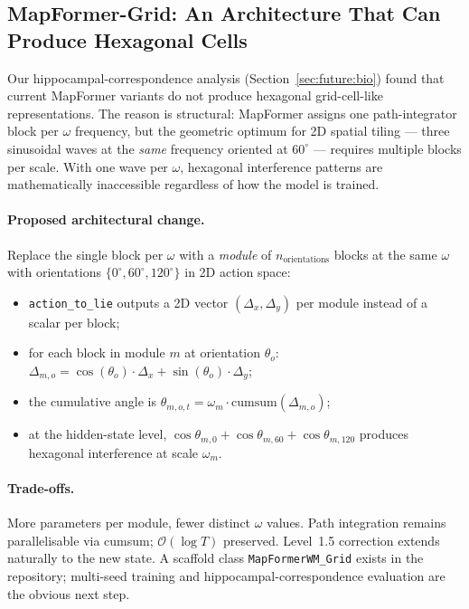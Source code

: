 \subsection{MapFormer-Grid: An Architecture That Can Produce Hexagonal Cells}
\label{sec:future:grid}

Our hippocampal-correspondence analysis (Section~\ref{sec:future:bio})
found that current MapFormer variants do not produce hexagonal
grid-cell-like representations. The reason is structural: MapFormer
assigns one path-integrator block per $\omega$ frequency, but the
geometric optimum for 2D spatial tiling --- three sinusoidal waves at
the \emph{same} frequency oriented at $60^\circ$ --- requires multiple
blocks per scale. With one wave per $\omega$, hexagonal interference
patterns are mathematically inaccessible regardless of how the model is
trained.

\paragraph{Proposed architectural change.} Replace the single block per
$\omega$ with a \emph{module} of $n_\mathrm{orientations}$ blocks at
the same $\omega$ with orientations $\{0^\circ, 60^\circ, 120^\circ\}$
in 2D action space:
\begin{itemize}
  \item \texttt{action\_to\_lie} outputs a 2D vector
  $(\Delta_x, \Delta_y)$ per module instead of a scalar per block;
  \item for each block in module $m$ at orientation $\theta_o$:
  $\Delta_{m,o} = \cos(\theta_o) \cdot \Delta_x + \sin(\theta_o) \cdot \Delta_y$;
  \item the cumulative angle is
  $\theta_{m,o,t} = \omega_m \cdot \mathrm{cumsum}(\Delta_{m,o})$;
  \item at the hidden-state level,
  $\cos\theta_{m,0} + \cos\theta_{m,60} + \cos\theta_{m,120}$
  produces hexagonal interference at scale $\omega_m$.
\end{itemize}

\paragraph{Trade-offs.} More parameters per module, fewer distinct
$\omega$ values. Path integration remains parallelisable via cumsum;
$\mathcal{O}(\log T)$ preserved. Level~1.5 correction extends naturally
to the new state. A scaffold class \texttt{MapFormerWM\_Grid} exists in
the repository; multi-seed training and hippocampal-correspondence
evaluation are the obvious next step.

